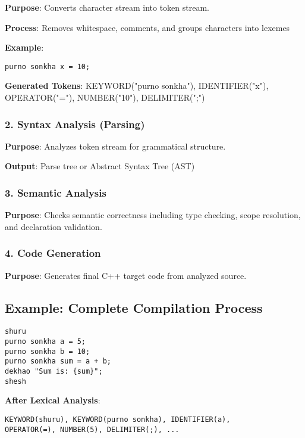 \documentclass[12pt,a4paper]{article}
\begin{document}
\textbf{Purpose}: Converts character stream into token stream.

\textbf{Process}: Removes whitespace, comments, and groups characters into lexemes

\textbf{Example}:
\begin{lstlisting}[caption=Banglish Code Input]
purno sonkha x = 10;
\end{lstlisting}

\textbf{Generated Tokens}: KEYWORD("purno sonkha"), IDENTIFIER("x"), OPERATOR("="), NUMBER("10"), DELIMITER(";")

\subsubsection{2. Syntax Analysis (Parsing)}

\textbf{Purpose}: Analyzes token stream for grammatical structure.

\textbf{Output}: Parse tree or Abstract Syntax Tree (AST)

\subsubsection{3. Semantic Analysis}

\textbf{Purpose}: Checks semantic correctness including type checking, scope resolution, and declaration validation.

\subsubsection{4. Code Generation}

\textbf{Purpose}: Generates final C++ target code from analyzed source.

\subsection{Example: Complete Compilation Process}

\begin{lstlisting}[caption=Banglish Source Code]
shuru
purno sonkha a = 5;
purno sonkha b = 10;
purno sonkha sum = a + b;
dekhao "Sum is: {sum}";
shesh
\end{lstlisting}

\textbf{After Lexical Analysis}:
\begin{verbatim}
KEYWORD(shuru), KEYWORD(purno sonkha), IDENTIFIER(a), 
OPERATOR(=), NUMBER(5), DELIMITER(;), ...
\end{verbatim}
\end{document}
